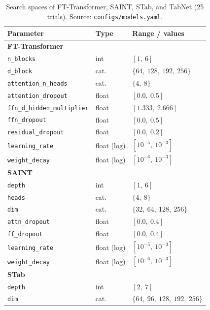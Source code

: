\begin{table}[htbp]
\centering\footnotesize
\caption[Search spaces --- attention architectures]{Search spaces of
FT-Transformer, SAINT, STab, and TabNet (25 trials). Source:
\texttt{configs/\allowbreak models.\allowbreak yaml}.}
\label{tab:app-busca-atencao}
\begin{tabular}{lll}
\toprule
Parameter & Type & Range / values \\
\midrule
\multicolumn{3}{l}{\textbf{FT-Transformer}} \\
\texttt{n\_blocks}                  & int   & $[1,\ 6]$ \\
\texttt{d\_block}                   & cat.  & $\{64,\ 128,\ 192,\ 256\}$ \\
\texttt{attention\_\allowbreak n\_\allowbreak heads}        & cat.  & $\{4,\ 8\}$ \\
\texttt{attention\_\allowbreak dropout}         & float & $[0.0,\ 0.5]$ \\
\texttt{ffn\_\allowbreak d\_\allowbreak hidden\_\allowbreak multiplier} & float & $[1.333,\ 2.666]$ \\
\texttt{ffn\_dropout}               & float & $[0.0,\ 0.5]$ \\
\texttt{residual\_\allowbreak dropout}          & float & $[0.0,\ 0.2]$ \\
\texttt{learning\_rate}             & float (log) & $[10^{-5},\ 10^{-3}]$ \\
\texttt{weight\_decay}              & float (log) & $[10^{-6},\ 10^{-3}]$ \\
\midrule
\multicolumn{3}{l}{\textbf{SAINT}} \\
\texttt{depth}          & int   & $[1,\ 6]$ \\
\texttt{heads}          & cat.  & $\{4,\ 8\}$ \\
\texttt{dim}            & cat.  & $\{32,\ 64,\ 128,\ 256\}$ \\
\texttt{attn\_dropout}  & float & $[0.0,\ 0.4]$ \\
\texttt{ff\_dropout}    & float & $[0.0,\ 0.4]$ \\
\texttt{learning\_rate} & float (log) & $[10^{-5},\ 10^{-3}]$ \\
\texttt{weight\_decay}  & float (log) & $[10^{-6},\ 10^{-3}]$ \\
\midrule
\multicolumn{3}{l}{\textbf{STab}} \\
\texttt{depth}          & int   & $[2,\ 7]$ \\
\texttt{dim}            & cat.  & $\{64,\ 96,\ 128,\ 192,\ 256\}$ \\

\end{tabular}
\end{table}
